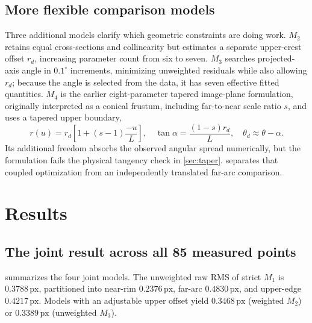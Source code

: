 \documentclass[11pt,letterpaper]{article}
\newcommand{\px}{\,\mathrm{px}}
\begin{document}
\subsection{More flexible comparison models}

Three additional models clarify which geometric constraints are doing work. \(M_2\) retains equal cross-sections and collinearity but estimates a separate upper-crest offset \(r_d\), increasing parameter count from six to seven. \(M_3\) searches projected-axis angle in \(0.1^\circ\) increments, minimizing unweighted residuals while also allowing \(r_d\); because the angle is selected from the data, it has seven effective fitted quantities. \(M_4\) is the earlier eight-parameter tapered image-plane formulation, originally interpreted as a conical frustum, including far-to-near scale ratio \(s\), and uses a tapered upper boundary,
\begin{equation}
 r(u)=r_d\left[1+(s-1)\frac{-u}{L}\right],\quad
 \tan\alpha=\frac{(1-s)r_d}{L},\quad
 \theta_d\approx\theta-\alpha.
 \label{eq:taper}
\end{equation}
Its additional freedom absorbs the observed angular spread numerically, but the formulation fails the physical tangency check in \cref{sec:taper}.  separates that coupled optimization from an independently translated far-arc comparison.

\section{Results}
\label{sec:results}

\subsection{The joint result across all 85 measured points}

 summarizes the four joint models. The unweighted raw RMS of strict \(M_1\) is \(0.3788\px\), partitioned into near-rim \(0.2376\px\), far-arc \(0.4830\px\), and upper-edge \(0.4217\px\). Models with an adjustable upper offset yield \(0.3468\px\) (weighted \(M_2\)) or \(0.3389\px\) (unweighted \(M_3\)).
\end{document}
